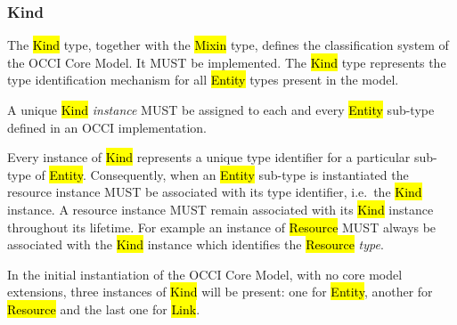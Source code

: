 \documentclass[10pt,a4paper]{article}
\begin{document}
\subsubsection{Kind}
\label{sec:kind}

The \hl{Kind} type, together with the \hl{Mixin} type, defines the
classification system of the OCCI Core Model. It MUST be
implemented. The \hl{Kind} type represents the type identification
mechanism for all \hl{Entity} types present in the model.

A unique \hl{Kind} {\em instance} MUST be assigned to each and every
\hl{Entity} sub-type defined in an OCCI implementation.

Every instance of \hl{Kind} represents a unique type identifier for a
particular sub-type of \hl{Entity}.  Consequently, when an \hl{Entity}
sub-type is instantiated the resource instance MUST be associated with
its type identifier, i.e.~the \hl{Kind} instance.  A resource instance
MUST remain associated with its \hl{Kind} instance throughout its
lifetime.
%
For example an instance of \hl{Resource} MUST always be associated
with the \hl{Kind} instance which identifies the \hl{Resource} {\em type}.

In the initial instantiation of the OCCI Core Model, with no core
model extensions, three instances of \hl{Kind} will be present: one
for \hl{Entity}, another for \hl{Resource} and the last one for
\hl{Link}.

\end{document}
